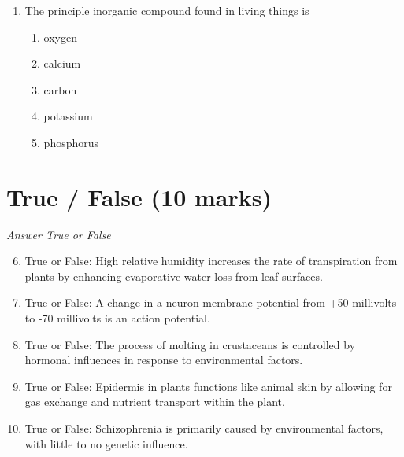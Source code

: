 \documentclass[12pt]{article}
\begin{document}
\begin{enumerate}[label=\arabic*.]
\begin{enumerate}[label=(\alph*)]
    \item Ferns grow larger because they can perform photosynthesis more efficiently than mosses
    \item Ferns grow larger due to higher nutrient content
    \item Ferns grow larger due to a stronger stem
    \item Ferns grow larger due to their ability to move to more fertile areas
    \item Mosses are limited in size by their shorter life cycle compared to ferns
\end{enumerate}
\item The principle inorganic compound found in living things is
\begin{enumerate}[label=(\alph*)]
    \item oxygen
    \item calcium
    \item carbon
    \item potassium
    \item phosphorus
\end{enumerate}
\end{enumerate}

\section*{True / False (10 marks)}
\textit{Answer True or False}
\begin{enumerate}[label=\arabic*.]
\setcounter{enumi}{5}
\item True or False: High relative humidity increases the rate of transpiration from plants by enhancing evaporative water loss from leaf surfaces.
\item True or False: A change in a neuron membrane potential from +50 millivolts to -70 millivolts is an action potential.
\item True or False: The process of molting in crustaceans is controlled by hormonal influences in response to environmental factors.
\item True or False: Epidermis in plants functions like animal skin by allowing for gas exchange and nutrient transport within the plant.
\item True or False: Schizophrenia is primarily caused by environmental factors, with little to no genetic influence.
\end{enumerate}
\end{document}
